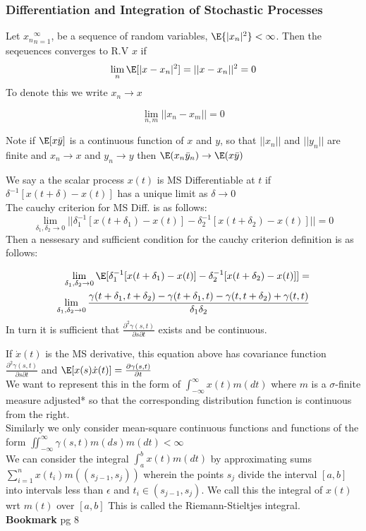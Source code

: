 \documentclass[answers,12pt,addpoints]{exam}
\begin{document}
\subsubsection{Differentiation and Integration of Stochastic Processes}
\begin{definition}
    Let ${x_n}_{n=1}^{\infty}$, be a sequence of random variables, $\E{|x_n|^2}<\infty$. Then the seqeuences converges to R.V $x$ if
    $$\lim_{n} \E[|x-x_n|^2] = ||x - x_n||^2 = 0$$
    To denote this we write $x_n \to x$
\end{definition}
\begin{definition}
    $$\lim_{n,m}||x_n-x_m|| = 0$$
\end{definition}
Note if $\E[x \bar{y}]$ is a continuous function of $x$ and $y$, so that $||x_n||$ and $||y_n||$ are finite and $x_n \to x$ and $y_n \to y$ then $\E(x_n \bar{y}_n) \to \E(x\bar{y})$
\begin{definition}
    We say a the scalar process $x(t)$ is MS Differentiable at $t$ if $\delta^{-1}[x(t+\delta) - x(t)]$ has a unique limit as $\delta \to 0$\\
    The cauchy criterion for MS Diff. is as follows: 
    $$\lim_{\delta_1, \delta_2 \to 0} ||\delta_1^{-1}[x(t+\delta_1) - x(t)] - \delta_2^{-1}[x(t+\delta_2) - x(t)] || = 0$$
    Then a nessesary and sufficient condition for the cauchy criterion definition is as follows:
    
    \begin{align*}
        \lim_{\delta_1, \delta_2 \to 0} \E[\delta_1^{-1}[x(t+\delta_1) - x(t)] - \delta_2^{-1}[x(t+\delta_2) - x(t)]] =\\
        \lim_{\delta_1, \delta_2 \to 0} \frac{\gamma(t+\delta_1, t+ \delta_2) - \gamma(t +\delta_1, t) - \gamma(t, t+ \delta_2) + \gamma(t, t)}{\delta_1 \delta_2}
    \end{align*}
    In turn it is sufficient that $\frac{\partial^2 \gamma(s,t)}{\partial s \partial t}$ exists and be continuous.
\end{definition}
If $\dot{x}(t)$ is the MS derivative, this equation above has covariance function $\frac{\partial^2 \gamma(s,t)}{\partial s \partial t}$ and $\E[x(s)\dot{x}(t)] = \frac{\partial \gamma(s,t)}{\partial t}$\\
We want to represent this in the form of $\int_{-\infty}^{\infty}x(t) m(dt)$ where $m$ is a $\sigma$-finite measure adjusted* so that the corresponding distribution function is continuous from the right. \\
Similarly we only consider mean-square continuous functions and functions of the form $\iint_{-\infty}^{\infty} \gamma(s,t) m(ds) m(dt) < \infty$\\ 
We can consider the integral $\int_{a}^{b} x(t) m(dt)$ by approximating sums $\sum_{i=1}^{n} x(t_i) m((s_{j-1}, s_j))$ wherein the points $s_j$ divide the interval $[a,b]$ into intervals less than $\epsilon$ and $t_i \in (s_{j-1}, s_j)$. We call this the integral of $x(t)$ wrt $m(t)$ over $[a,b]$ This is called the Riemann-Stieltjes integral.\\




\textbf{Bookmark} pg 8 
\end{document}
